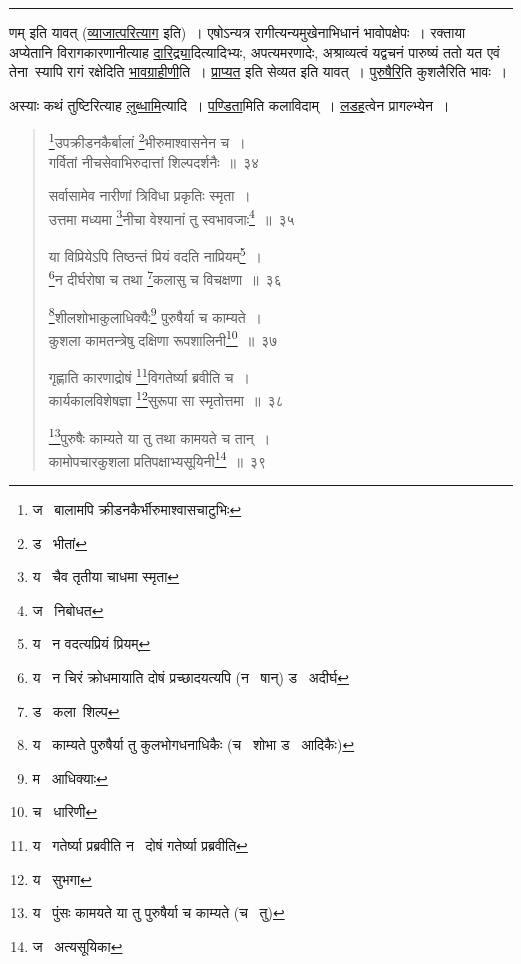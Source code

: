 \documentclass[11pt, openany]{book}
\begin{document}
\hrule

\vspace{2mm}
\noindent
णम् इति यावत् (\underline{व्याजात्परित्याग} इति)~। एषोऽन्यत्र रागीत्यन्यमुखेनाभिधानं भावोपक्षेपः~। रक्ताया अप्येतानि विरागकारणानीत्याह \underline{दारिद्र्या}दित्यादिभ्यः, अपत्यमरणादेः, अश्राव्यत्वं यद्वचनं पारुष्यं ततो यत एवं तेना\textendash\ स्यापि रागं रक्षेदिति \underline{भावग्राहीणी}ति~। \underline{प्राप्यत} इति सेव्यत इति यावत्~। \underline{पुरुषैरि}ति कुशलैरिति भावः~।\\

\begin{sloppypar}
अस्याः कथं तुष्टिरित्याह \underline{लुब्धामि}त्यादि~। \underline{पण्डिता}मिति कलाविदाम्~। \underline{लडह}त्वेन प्रागल्भ्येन~।
\end{sloppypar}

\newpage

\begin{quote}
{\na \renewcommand{\thefootnote}{1}\footnote{ज \textendash\  बालामपि क्रीडनकैर्भीरुमाश्वासचाटुभिः}उपक्रीडनकैर्बालां \renewcommand{\thefootnote}{2}\footnote{ड \textendash\  भीतां}भीरुमाश्वासनेन च~।\\
गर्वितां नीचसेवाभिरुदात्तां शिल्पदर्शनैः~॥~३४

सर्वासामेव नारीणां त्रिविधा प्रकृतिः स्मृता~।\\
उत्तमा मध्यमा \renewcommand{\thefootnote}{3}\footnote{य \textendash\  चैव तृतीया चाधमा स्मृता}नीचा वेश्यानां तु स्वभावजाः\renewcommand{\thefootnote}{4}\footnote{ज \textendash\  निबोधत}~॥~३५

या विप्रियेऽपि तिष्ठन्तं प्रियं वदति नाप्रियम्\renewcommand{\thefootnote}{5}\footnote{य \textendash\  न वदत्यप्रियं प्रियम्}~।\\
\renewcommand{\thefootnote}{6}\footnote{य \textendash\  न चिरं क्रोधमायाति दोषं प्रच्छादयत्यपि (न \textendash\  षान्) ड \textendash\  अदीर्घ}न दीर्घरोषा च तथा \renewcommand{\thefootnote}{7}\footnote{ड \textendash\  कला\textendash\ शिल्प}कलासु च विचक्षणा~॥~३६

\renewcommand{\thefootnote}{8}\footnote{य \textendash\  काम्यते पुरुषैर्या तु कुलभोगधनाधिकैः (च \textendash\  शोभा ड \textendash\  आदिकैः)}शीलशोभाकुलाधिक्यैः\renewcommand{\thefootnote}{9}\footnote{म \textendash\  आधिक्याः} पुरुषैर्या च काम्यते~।\\
कुशला कामतन्त्रेषु दक्षिणा रूपशालिनी\renewcommand{\thefootnote}{10}\footnote{च \textendash\  धारिणी}~॥~३७

गृह्णाति कारणाद्रोषं \renewcommand{\thefootnote}{11}\footnote{य \textendash\  गतेर्ष्या प्रब्रवीति न \textendash\  दोषं गतेर्ष्या प्रब्रवीति}विगतेर्ष्या ब्रवीति च~।\\
कार्यकालविशेषज्ञा \renewcommand{\thefootnote}{12}\footnote{य \textendash\  सुभगा}सुरूपा सा स्मृतोत्तमा~॥~३८

\renewcommand{\thefootnote}{13}\footnote{य \textendash\  पुंसः कामयते या तु पुरुषैर्या च काम्यते (च \textendash\  तु)}पुरुषैः काम्यते या तु तथा कामयते च तान्~।\\
कामोपचारकुशला प्रतिपक्षाभ्यसूयिनी\renewcommand{\thefootnote}{14}\footnote{ज \textendash\  अत्यसूयिका}~॥~३९}
\end{quote}
\end{document}
